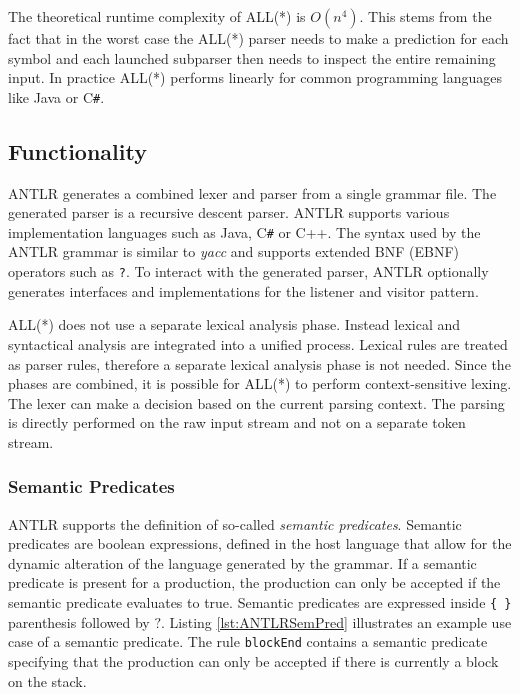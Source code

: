 The theoretical runtime complexity of ALL(*) is $O(n^4)$. This stems from the fact that in the worst case the ALL(*) parser needs to make a prediction for each symbol and each launched subparser then needs to inspect the entire remaining input. In practice ALL(*) performs linearly for common programming languages like Java or C\verb|#|.


\subsection{Functionality}

ANTLR generates a combined lexer and parser from a single grammar file. The generated parser is a recursive descent parser. ANTLR supports various implementation languages such as Java, C\verb|#| or C++. The syntax used by the ANTLR grammar is similar to \textit{yacc} and supports extended BNF (EBNF) operators such as \texttt{?}. To interact with the generated parser, ANTLR optionally generates interfaces and implementations for the listener and visitor pattern.

ALL(*) does not use a separate lexical analysis phase. Instead lexical and syntactical analysis are integrated into a unified process. Lexical rules are treated as parser rules, therefore a separate lexical analysis phase is not needed. Since the phases are combined, it is possible for ALL(*) to perform context-sensitive lexing. The lexer can make a decision based on the current parsing context. The parsing is directly performed on the raw input stream and not on a separate token stream. 

\subsubsection{Semantic Predicates}

ANTLR supports the definition of so-called \textit{semantic predicates}. Semantic predicates are boolean expressions, defined in the host language that allow for the dynamic alteration of the language generated by the grammar. If a semantic predicate is present for a production, the production can only be accepted if the semantic predicate evaluates to true. Semantic predicates are expressed inside \verb|{ }| parenthesis followed by $?$. Listing \ref{lst:ANTLRSemPred} illustrates an example use case of a semantic predicate. The rule \texttt{blockEnd} contains a semantic predicate specifying that the production can only be accepted if there is currently a block on the stack. 

